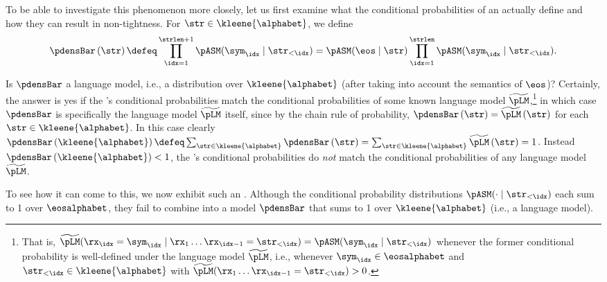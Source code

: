 To be able to investigate this phenomenon more closely, let us first examine what the conditional probabilities of an \autoregmodel actually define and how they can result in non-tightness. 
For $\str \in \kleene{\alphabet}$, we define 
\begin{equation}
\pdensBar\left(\str\right) \defeq \prod_{\idx=1}^{\strlen+1}\pASM(\sym_\idx\mid\str_{<\idx})=\pASM(\eos\mid\str)\prod_{\idx=1}^{\strlen}\pASM(\sym_\idx\mid \str_{<\idx}).
\end{equation}

Is $\pdensBar$ a language model, i.e., a distribution over $\kleene{\alphabet}$ (after taking into account the semantics of $\eos$)?
Certainly, the answer is yes if the \autoregmodelAcronym's conditional probabilities match the conditional probabilities of some known language model $\widetilde{\pLM}$,\footnote{That is, $\widetilde{\pLM}(\rx_\idx=\sym_\idx\mid \rx_1\ldots \rx_{\idx-1}=\str_{<\idx}) = \pASM(\sym_\idx\mid\str_{<\idx})$ whenever the former conditional probability is well-defined under the language model $\widetilde{\pLM}$, i.e., whenever $\sym_\idx \in \eosalphabet$ and $\str_{<\idx}\in\kleene{\alphabet}$ with $\widetilde{\pLM}(\rx_1\ldots \rx_{\idx-1}=\str_{<\idx}) > 0$.} in which case $\pdensBar$ is specifically the language model $\widetilde{\pLM}$ itself, since by the chain rule of probability, $\pdensBar\left(\str\right)=\widetilde{\pLM}\left(\str\right)$ for each $\str\in\kleene{\alphabet}$.
In this case clearly $\pdensBar\left(\kleene{\alphabet}\right) \defeq \sum_{\str\in\kleene{\alphabet}}\pdensBar\left(\str\right) = \sum_{\str\in\kleene{\alphabet}}\widetilde{\pLM}\left(\str\right) = 1$.  
Instead $\pdensBar\left(\kleene{\alphabet}\right) < 1$, the \autoregmodelAcronym's conditional probabilities do \emph{not} match the conditional probabilities of any language model $\widetilde{\pLM}$.

To see how it can come to this, we now exhibit such an \autoregmodelAcronym.
Although the conditional probability distributions $\pASM(\cdot \mid \str_{<\idx})$ each sum to 1 over $\eosalphabet$, they fail to combine into a model $\pdensBar$ that sums to 1 over $\kleene{\alphabet}$ (i.e., a language model).

